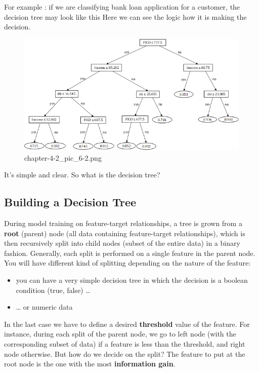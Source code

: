 \documentclass[11pt]{article}
\providecommand{\tightlist}{%
      \setlength{\itemsep}{0pt}\setlength{\parskip}{0pt}}
\begin{document}
For example : if we are classifying bank loan application for a
customer, the decision tree may look like this Here we can see the logic
how it is making the decision.

    \begin{figure}
\centering
\includegraphics{./pic/chapter-4-2_pic_6.png}
\caption{chapter-4-2\_pic\_6-2.png}
\end{figure}

    It's simple and clear. So what is the decision tree?

    \hypertarget{building-a-decision-tree}{%
\subsection{Building a Decision Tree}\label{building-a-decision-tree}}

During model training on feature-target relationships, a tree is grown
from a \textbf{root} (parent) node (all data containing feature-target
relationships), which is then recursively split into child nodes (subset
of the entire data) in a binary fashion. Generally, each split is
performed on a single feature in the parent node. You will have
different kind of splitting depending on the nature of the feature:

\begin{itemize}
\tightlist
\item
  you can have a very simple decision tree in which the decision is a
  boolean condition (true, false) \ldots{}
\item
  \ldots{} or numeric data
\end{itemize}

In the last case we have to define a desired \textbf{threshold} value of
the feature. For instance, during each split of the parent node, we go
to left node (with the corresponding subset of data) if a feature is
less than the threshold, and right node otherwise. But how do we decide
on the split? The feature to put at the root node is the one with the
most \textbf{information gain}.
\end{document}
